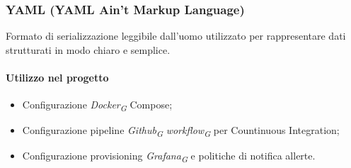 \subsubsection{YAML (YAML Ain't Markup Language)}
Formato di serializzazione leggibile dall'uomo utilizzato per rappresentare dati strutturati in modo chiaro e semplice.

\paragraph{Utilizzo nel progetto}
\begin{itemize}
    \item Configurazione \textit{Docker}\textsubscript{\textit{G}} Compose;
    \item Configurazione pipeline \textit{Github}\textsubscript{\textit{G}} \textit{workflow}\textsubscript{\textit{G}} per Countinuous Integration;
    \item Configurazione provisioning \textit{Grafana}\textsubscript{\textit{G}} e politiche di notifica allerte.
\end{itemize}